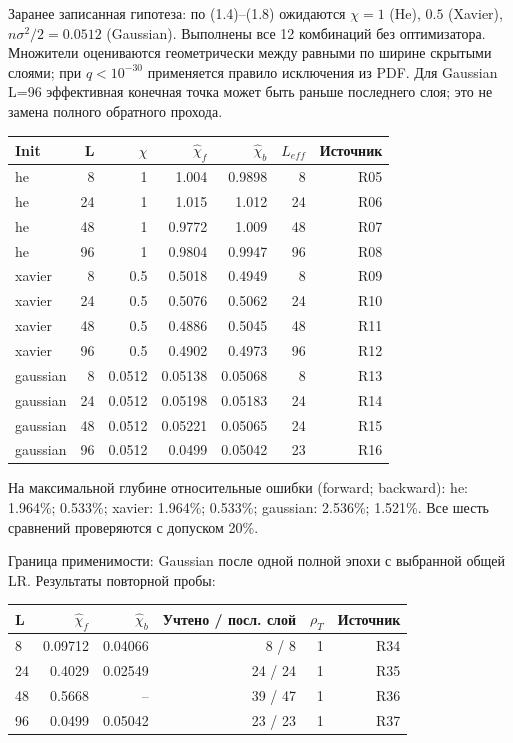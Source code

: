 \documentclass[10pt,a4paper]{article}
\begin{document}
Заранее записанная гипотеза: по (1.4)--(1.8) ожидаются $\chi=1$ (He), $0.5$ (Xavier), $n\sigma^2/2=0.0512$ (Gaussian). Выполнены все 12 комбинаций без оптимизатора. Множители оцениваются геометрически между равными по ширине скрытыми слоями; при $q<10^{-30}$ применяется правило исключения из PDF. Для Gaussian L=96 эффективная конечная точка может быть раньше последнего слоя; это не замена полного обратного прохода.

\begin{center}\small
\begin{tabular}{lrrrrrr}
\toprule
Init & L & $\chi$ & $\hat\chi_f$ & $\hat\chi_b$ & $L_{eff}$ & Источник \\
\midrule
he & 8 & 1 & 1.004 & 0.9898 & 8 & R05 \\
he & 24 & 1 & 1.015 & 1.012 & 24 & R06 \\
he & 48 & 1 & 0.9772 & 1.009 & 48 & R07 \\
he & 96 & 1 & 0.9804 & 0.9947 & 96 & R08 \\
xavier & 8 & 0.5 & 0.5018 & 0.4949 & 8 & R09 \\
xavier & 24 & 0.5 & 0.5076 & 0.5062 & 24 & R10 \\
xavier & 48 & 0.5 & 0.4886 & 0.5045 & 48 & R11 \\
xavier & 96 & 0.5 & 0.4902 & 0.4973 & 96 & R12 \\
gaussian & 8 & 0.0512 & 0.05138 & 0.05068 & 8 & R13 \\
gaussian & 24 & 0.0512 & 0.05198 & 0.05183 & 24 & R14 \\
gaussian & 48 & 0.0512 & 0.05221 & 0.05065 & 24 & R15 \\
gaussian & 96 & 0.0512 & 0.0499 & 0.05042 & 23 & R16 \\
\bottomrule
\end{tabular}\end{center}

На максимальной глубине относительные ошибки (forward; backward): he: 1.964\%; 0.533\%; xavier: 1.964\%; 0.533\%; gaussian: 2.536\%; 1.521\%. Все шесть сравнений проверяются с допуском 20\%.

Граница применимости: Gaussian после одной полной эпохи с выбранной общей LR. Результаты повторной пробы:

\begin{center}\small
\begin{tabular}{lrrrrr}
\toprule
L & $\hat\chi_f$ & $\hat\chi_b$ & Учтено / посл. слой & $\rho_T$ & Источник \\
\midrule
8 & 0.09712 & 0.04066 & 8 / 8 & 1 & R34 \\
24 & 0.4029 & 0.02549 & 24 / 24 & 1 & R35 \\
48 & 0.5668 & -- & 39 / 47 & 1 & R36 \\
96 & 0.0499 & 0.05042 & 23 / 23 & 1 & R37 \\
\bottomrule
\end{tabular}\end{center}
\end{document}
